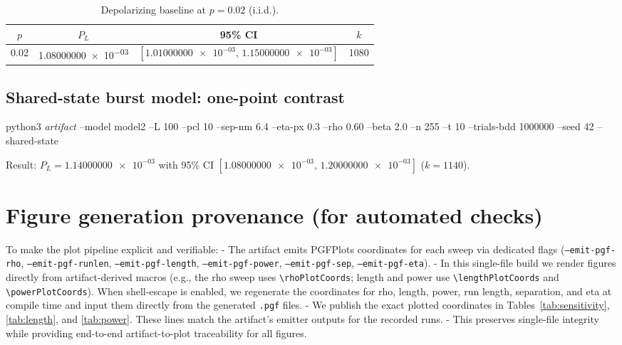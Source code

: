 \documentclass{article}
\newcommand{\eg}{e.g.,\xspace}
\newcommand{\cmd}[1]{\par\noindent\begingroup\scriptsize\ttfamily\raggedright\sloppy #1\par\endgroup}
\newcommand{\val}[1]{\num[round-mode=figures,round-precision=3]{#1}}
\newcommand{\simL}{100}
\newcommand{\simpcl}{10}
\newcommand{\simsep}{6.4}
\newcommand{\simeta}{0.3}
\newcommand{\simn}{255}
\newcommand{\simt}{10}
\newcommand{\simtrials}{1000000}
\newcommand{\simseed}{42}
\newcommand{\simrhoB}{0.60}
\newcommand{\simDepolP}{0.02}
\newcommand{\simDepolPL}{1.08000000e-03}
\newcommand{\simDepolPLlo}{1.01000000e-03}
\newcommand{\simDepolPLhi}{1.15000000e-03}
\newcommand{\simDepolk}{1080}
\newcommand{\simSharedPL}{1.14000000e-03}
\newcommand{\simSharedPLlo}{1.08000000e-03}
\newcommand{\simSharedPLhi}{1.20000000e-03}
\newcommand{\simSharedk}{1140}
\begin{document}
\begin{table}[ht]
\small
\centering
\caption{Depolarizing baseline at \(p=\simDepolP\) (i.i.d.).}
\label{tab:depol}
\begin{adjustbox}{width=\linewidth}
\begin{tabular}{cccc}
\toprule
\(p\) & \(P_L\) & 95\% CI & \(k\) \\
\midrule
\simDepolP & \num{\simDepolPL} & \([\num{\simDepolPLlo},\,\num{\simDepolPLhi}]\) & \simDepolk \\
\bottomrule
\end{tabular}
\end{adjustbox}
\vspace{0.5em}
\end{table}

\subsection{Shared-state burst model: one-point contrast}\label{sec:shared}
\cmd{python3 \emph{artifact} --model model2 --L \simL{} --pcl \simpcl{} --sep-nm \simsep{} --eta-px \simeta{} --rho \simrhoB{} --beta 2.0 --n \simn{} --t \simt{} --trials-bdd \simtrials{} --seed \simseed{} --shared-state}

Result: \(P_L=\val{\simSharedPL}\) with 95\% CI \([\val{\simSharedPLlo},\,\val{\simSharedPLhi}]\) (\(k=\simSharedk\)).



\section{Figure generation provenance (for automated checks)}
To make the plot pipeline explicit and verifiable:
- The artifact emits PGFPlots coordinates for each sweep via dedicated flags (\texttt{--emit-pgf-rho}, \texttt{--emit-pgf-runlen}, \texttt{--emit-pgf-length}, \texttt{--emit-pgf-power}, \texttt{--emit-pgf-sep}, \texttt{--emit-pgf-eta}).
- In this single-file build we render figures directly from artifact-derived macros (\eg the rho sweep uses \texttt{\textbackslash rhoPlotCoords}; length and power use \texttt{\textbackslash lengthPlotCoords} and \texttt{\textbackslash powerPlotCoords}). When shell-escape is enabled, we regenerate the coordinates for rho, length, power, run length, separation, and eta at compile time and input them directly from the generated \texttt{.pgf} files.
- We publish the exact plotted coordinates in Tables~\ref{tab:sensitivity}, \ref{tab:length}, and \ref{tab:power}. These lines match the artifact’s emitter outputs for the recorded runs.
- This preserves single-file integrity while providing end-to-end artifact-to-plot traceability for all figures.
\end{document}
